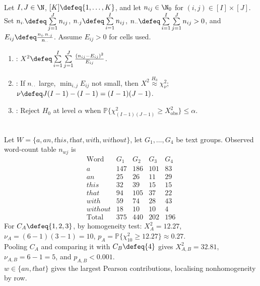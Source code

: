 \begin{method} \label{meth:pearson-homogeneity-test} \\
Let $I,J\in\N$, $[K]\defeq\{1,\ldots,K\}$, and let $n_{ij}\in\N_0$ for $(i,j)\in[I]\times[J]$.\\
Set $n_{i\cdot}\defeq\sum\limits_{j=1}^{J}n_{ij}$, $n_{\cdot j}\defeq\sum\limits_{i=1}^{I}n_{ij}$, $n_{\cdot\cdot}\defeq\sum\limits_{i=1}^{I}\sum\limits_{j=1}^{J}n_{ij}>0$, and $E_{ij}\defeq\frac{n_{i\cdot}n_{\cdot j}}{n_{\cdot\cdot}}$. Assume $E_{ij}>0$ for cells used.
\begin{enumerate}[label=(\roman*)]
\setlength{\itemsep}{0pt}
\item {}: $X^2\defeq\sum\limits_{i=1}^{I}\sum\limits_{j=1}^{J}\frac{(n_{ij}-E_{ij})^2}{E_{ij}}$.
\item {}: If $n_{\cdot\cdot}$ large, $\min_{i,j}E_{ij}$ not small, then $X^2\overset{H_0}{\approx}\chi^2_{\nu}$; $\nu\defeq J(I-1)-(I-1)=(I-1)(J-1)$.
\item {}: Reject $H_0$ at level $\alpha$ when $\mathbb{P}\{\chi^2_{(I-1)(J-1)}\geq X^2_{\mathrm{obs}}\}\leq\alpha$.
\end{enumerate}
\end{method}

\begin{example} \label{ex:austen-word-count-homogeneity} \\
Let $W=\{\textit{a},\textit{an},\textit{this},\textit{that},\textit{with},\textit{without}\}$, let $G_1,\ldots,G_4$ be text groups. Observed word-count table $n_{wj}$ is
\[
\begin{array}{c|rrrr}
\text{Word}&G_1&G_2&G_3&G_4\\ \hline
a&147&186&101&83\\
an&25&26&11&29\\
this&32&39&15&15\\
that&94&105&37&22\\
with&59&74&28&43\\
without&18&10&10&4\\ \hline
\text{Total}&375&440&202&196
\end{array}
\]
For $C_A\defeq\{1,2,3\}$, by homogeneity test: $X_A^2=12.27$, $\nu_A=(6-1)(3-1)=10$, $p_A=\mathbb{P}\{\chi^2_{10}\geq12.27\}\approx0.27$.\\
Pooling $C_A$ and comparing it with $C_B\defeq\{4\}$ gives $X_{A,B}^2=32.81$, $\nu_{A,B}=6-1=5$, and $p_{A,B}<0.001$.\\
$w\in\{\textit{an},\textit{that}\}$ gives the largest Pearson contributions, localising nonhomogeneity by row.
\end{example}

